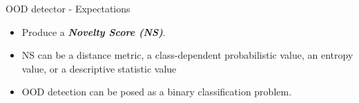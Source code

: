 \documentclass[10pt, aspectratio=169]{beamer}
\begin{document}
\begin{frame}{OOD detector - Expectations}
    \begin{itemize}
        \item Produce a \textbf{\textit{Novelty Score (NS)}}. 
        \item NS can be a distance metric, a class-dependent probabilistic value, an entropy value, or a descriptive statistic value
        \item OOD detection can be posed as a binary classification problem.
    \end{itemize}
        
    
    

    
    


\end{frame}
\end{document}
